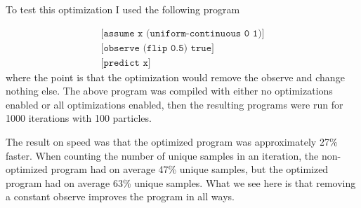 \documentclass[a4paper]{article}
\begin{document}
To test this optimization I used the following program

\[
	\begin{array}{l}
		\texttt{[assume x (uniform-continuous 0 1)]} \\
		\texttt{[observe (flip 0.5) true]} \\
		\texttt{[predict x]}
	\end{array}
\]
where the point is that the optimization would remove the observe and change nothing else. The above program was compiled with either no optimizations enabled or all optimizations enabled, then the resulting programs were run for 1000 iterations with 100 particles.

The result on speed was that the optimized program was approximately 27\% faster. When counting the number of unique samples in an iteration, the non-optimized program had on average 47\% unique samples, but the optimized program had on average 63\% unique samples. What we see here is that removing a constant observe improves the program in all ways.
\end{document}
